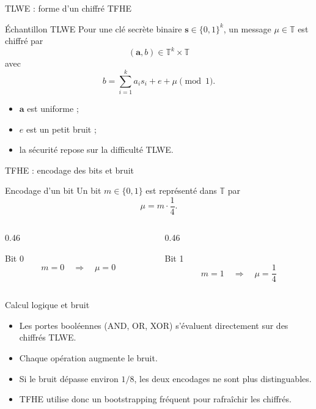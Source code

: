 \documentclass[10pt,aspectratio=169]{beamer}
\newcommand{\TT}{\mathbb{T}}
\begin{document}
\begin{frame}{TLWE : forme d'un chiffré TFHE}
  \begin{block}{Échantillon TLWE}
    Pour une clé secrète binaire $\mathbf s\in\{0,1\}^k$, un message $\mu\in\TT$ est chiffré par
    \[
      (\mathbf a,b)\in \TT^k\times\TT
    \]
    avec
    \[
      b=\sum_{i=1}^k a_i s_i + e + \mu \pmod 1.
    \]
  \end{block}

  \begin{itemize}
    \item $\mathbf a$ est uniforme ;
    \item $e$ est un petit bruit ;
    \item la sécurité repose sur la difficulté TLWE.
  \end{itemize}
\end{frame}

\begin{frame}{TFHE : encodage des bits et bruit}

  \begin{block}{Encodage d’un bit}
    Un bit $m\in\{0,1\}$ est représenté dans $\TT$ par
    \[
      \mu = m \cdot \frac14.
    \]
  \end{block}

  \begin{columns}[T,onlytextwidth]
    \begin{column}{0.46\textwidth}
      \begin{exampleblock}{Bit 0}
        \[
          m=0
          \quad\Rightarrow\quad
          \mu=0
        \]
      \end{exampleblock}
    \end{column}

    \begin{column}{0.46\textwidth}
      \begin{exampleblock}{Bit 1}
        \[
          m=1
          \quad\Rightarrow\quad
          \mu=\frac14
        \]
      \end{exampleblock}
    \end{column}
  \end{columns}

  \vspace{0.2cm}

  \begin{block}{Calcul logique et bruit}
    \begin{itemize}
      \item Les portes booléennes (AND, OR, XOR) s’évaluent directement sur des chiffrés TLWE.
      \item Chaque opération augmente le bruit.
      \item Si le bruit dépasse environ $1/8$, les deux encodages ne sont plus distinguables.
      \item TFHE utilise donc un bootstrapping fréquent pour rafraîchir les chiffrés.
    \end{itemize}
  \end{block}

\end{frame}
\end{document}
